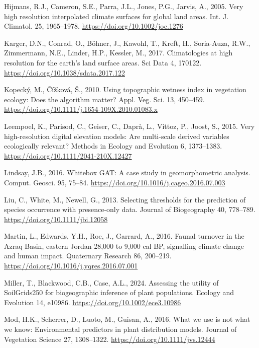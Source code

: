 \documentclass[
  number,
  review]{elsarticle}
\newlength{\cslhangindent}
\newenvironment{CSLReferences}[2] %
 {\begin{list}{}{%
  \setlength{\itemindent}{0pt}
  \setlength{\leftmargin}{0pt}
  \setlength{\parsep}{0pt}
  \ifodd #1
   \setlength{\leftmargin}{\cslhangindent}
   \setlength{\itemindent}{-1\cslhangindent}
  \fi
  \setlength{\itemsep}{#2\baselineskip}}}
 {\end{list}}
\begin{document}
\begin{CSLReferences}{1}{0}
Hijmans, R.J., Cameron, S.E., Parra, J.L., Jones, P.G., Jarvis, A.,
2005. Very high resolution interpolated climate surfaces for global land
areas. Int. J. Climatol. 25, 1965--1978.
\url{https://doi.org/10.1002/joc.1276}

Karger, D.N., Conrad, O., Böhner, J., Kawohl, T., Kreft, H., Soria-Auza,
R.W., Zimmermann, N.E., Linder, H.P., Kessler, M., 2017. Climatologies
at high resolution for the earth's land surface areas. Sci Data 4,
170122. \url{https://doi.org/10.1038/sdata.2017.122}

Kopecký, M., Čížková, Š., 2010. Using topographic wetness index in
vegetation ecology: Does the algorithm matter? Appl. Veg. Sci. 13,
450--459. \url{https://doi.org/10.1111/j.1654-109X.2010.01083.x}

Leempoel, K., Parisod, C., Geiser, C., Daprà, L., Vittoz, P., Joost, S.,
2015. Very high-resolution digital elevation models: Are multi-scale
derived variables ecologically relevant? Methods in Ecology and
Evolution 6, 1373--1383. \url{https://doi.org/10.1111/2041-210X.12427}

Lindsay, J.B., 2016. Whitebox {GAT}: {A} case study in geomorphometric
analysis. Comput. Geosci. 95, 75--84.
\url{https://doi.org/10.1016/j.cageo.2016.07.003}

Liu, C., White, M., Newell, G., 2013. Selecting thresholds for the
prediction of species occurrence with presence-only data. Journal of
Biogeography 40, 778--789. \url{https://doi.org/10.1111/jbi.12058}

Martin, L., Edwards, Y.H., Roe, J., Garrard, A., 2016. Faunal turnover
in the {Azraq Basin}, eastern {Jordan} 28,000 to 9,000 cal {BP},
signalling climate change and human impact. Quaternary Research 86,
200--219. \url{https://doi.org/10.1016/j.yqres.2016.07.001}

Miller, T., Blackwood, C.B., Case, A.L., 2024. Assessing the utility of
{SoilGrids250} for biogeographic inference of plant populations. Ecology
and Evolution 14, e10986. \url{https://doi.org/10.1002/ece3.10986}

Mod, H.K., Scherrer, D., Luoto, M., Guisan, A., 2016. What we use is not
what we know: Environmental predictors in plant distribution models.
Journal of Vegetation Science 27, 1308--1322.
\url{https://doi.org/10.1111/jvs.12444}


\end{CSLReferences}
\end{document}
